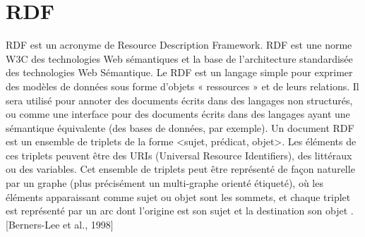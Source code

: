 \documentclass[12pt]{report}
\begin{document}
\section{RDF}
RDF est un acronyme de Resource Description Framework. RDF est une norme W3C des technologies Web sémantiques et la base de l’architecture standardisée des technologies Web Sémantique. Le RDF est un langage simple pour exprimer des modèles de données sous forme d'objets « ressources » et de leurs relations. Il sera utilisé pour annoter des documents écrits dans des langages non structurés, ou comme une interface pour des documents écrits dans des langages ayant une sémantique équivalente (des bases de données, par exemple).
Un document RDF est un ensemble de triplets de la forme <sujet, prédicat, objet>. Les éléments de ces triplets peuvent être des URIs (Universal Resource Identifiers), des littéraux ou des variables. Cet ensemble de triplets peut être représenté de façon naturelle par un graphe (plus précisément un multi-graphe orienté étiqueté), où les éléments apparaissant comme sujet ou objet sont les sommets, et chaque triplet est représenté par un arc dont l’origine est son sujet et la destination son objet . [Berners-Lee et al., 1998]
\end{document}
